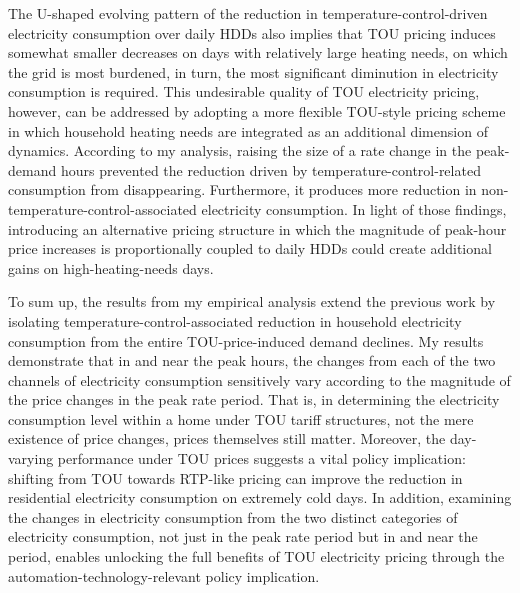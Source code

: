 The U-shaped evolving pattern of the reduction in temperature-control-driven electricity consumption over daily HDDs also implies that TOU pricing induces somewhat smaller decreases on days with relatively large heating needs, on which the grid is most burdened, in turn, the most significant diminution in electricity consumption is required. This undesirable quality of TOU electricity pricing, however, can be addressed by adopting a more flexible TOU-style pricing scheme in which household heating needs are integrated as an additional dimension of dynamics. According to my analysis, raising the size of a rate change in the peak-demand hours prevented the reduction driven by temperature-control-related consumption from disappearing. Furthermore, it produces more reduction in non-temperature-control-associated electricity consumption. In light of those findings, introducing an alternative pricing structure in which the magnitude of peak-hour price increases is proportionally coupled to daily HDDs could create additional gains on high-heating-needs days.  

To sum up, the results from my empirical analysis extend the previous work by isolating temperature-control-associated reduction in household electricity consumption from the entire TOU-price-induced demand declines. My results demonstrate that in and near the peak hours, the changes from each of the two channels of electricity consumption sensitively vary according to the magnitude of the price changes in the peak rate period. That is, in determining the electricity consumption level within a home under TOU tariff structures, not the mere existence of price changes, prices themselves still matter. Moreover, the day-varying performance under TOU prices suggests a vital policy implication: shifting from TOU towards RTP-like pricing can improve the reduction in residential electricity consumption on extremely cold days. In addition, examining the changes in electricity consumption from the two distinct categories of electricity consumption, not just in the peak rate period but in and near the period, enables unlocking the full benefits of TOU electricity pricing through the automation-technology-relevant policy implication.
